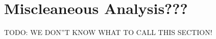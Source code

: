 \documentclass[12pt]{iopart}
\begin{document}

\section{Miscleaneous Analysis???}
TODO: WE DON''T KNOW WHAT TO CALL THIS SECTION!
\end{document}
